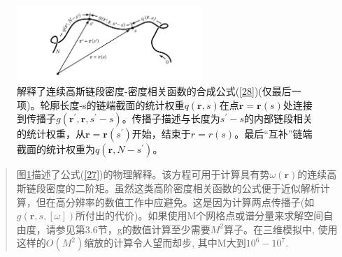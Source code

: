 \begin{figure}[h]
\centering
\includegraphics[width=7cm]{33.png}
\caption{解释了连续高斯链段密度-密度相关函数的合成公式(\ref{28})(仅最后一项)。轮廓长度-s的链端截面的统计权重$q(\mathbf{r},s)$在点$\mathbf{r}=\mathbf{r}(s)$处连接到传播子$g(\mathbf{r}^{'},\mathbf{r},s^{'}-s)$。传播子描述与长度为$s^{'}-s$的内部链段相关的统计权重，从$\mathbf{r}=\mathbf{r}(s^{'})$开始，结束于$r=r(s)$。最后“互补”链端截面的统计权重为$q(\mathbf{r},N-s^{'})$。}
\label{figure2}
\end{figure}
\begin{quotation}
图\ref{figure2}描述了公式(\ref{27})的物理解释。该方程可用于计算具有势$\omega(\mathbf{r})$的连续高斯链段密度的二阶矩。虽然这类高阶密度相关函数的公式便于近似解析计算，但在高分辨率的数值工作中应避免。这是因为计算两点传播子(如$g(\mathbf{r},s,[\omega])$所付出的代价)。如果使用M个网格点或谱分量来求解空间自由度，请参见第3.6节，g的数值计算至少需要$M^2$算子。在三维模拟中, 使用这样的$O(M^2)$缩放的计算令人望而却步, 其中M大到$10^6-10^7$.
\end{quotation}
